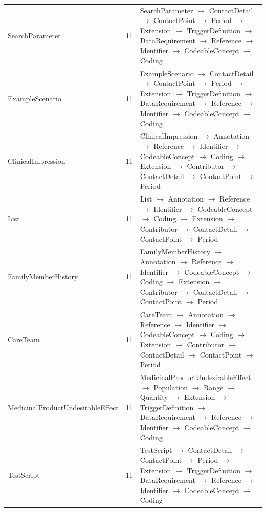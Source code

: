 \begin{longtable}{lrl}
SearchParameter & 11 & SearchParameter $\rightarrow$ ContactDetail $\rightarrow$ ContactPoint $\rightarrow$ Period $\rightarrow$ Extension $\rightarrow$ TriggerDefinition $\rightarrow$ DataRequirement $\rightarrow$ Reference $\rightarrow$ Identifier $\rightarrow$ CodeableConcept $\rightarrow$ Coding \\
ExampleScenario & 11 & ExampleScenario $\rightarrow$ ContactDetail $\rightarrow$ ContactPoint $\rightarrow$ Period $\rightarrow$ Extension $\rightarrow$ TriggerDefinition $\rightarrow$ DataRequirement $\rightarrow$ Reference $\rightarrow$ Identifier $\rightarrow$ CodeableConcept $\rightarrow$ Coding \\
ClinicalImpression & 11 & ClinicalImpression $\rightarrow$ Annotation $\rightarrow$ Reference $\rightarrow$ Identifier $\rightarrow$ CodeableConcept $\rightarrow$ Coding $\rightarrow$ Extension $\rightarrow$ Contributor $\rightarrow$ ContactDetail $\rightarrow$ ContactPoint $\rightarrow$ Period \\
List & 11 & List $\rightarrow$ Annotation $\rightarrow$ Reference $\rightarrow$ Identifier $\rightarrow$ CodeableConcept $\rightarrow$ Coding $\rightarrow$ Extension $\rightarrow$ Contributor $\rightarrow$ ContactDetail $\rightarrow$ ContactPoint $\rightarrow$ Period \\
FamilyMemberHistory & 11 & FamilyMemberHistory $\rightarrow$ Annotation $\rightarrow$ Reference $\rightarrow$ Identifier $\rightarrow$ CodeableConcept $\rightarrow$ Coding $\rightarrow$ Extension $\rightarrow$ Contributor $\rightarrow$ ContactDetail $\rightarrow$ ContactPoint $\rightarrow$ Period \\
CareTeam & 11 & CareTeam $\rightarrow$ Annotation $\rightarrow$ Reference $\rightarrow$ Identifier $\rightarrow$ CodeableConcept $\rightarrow$ Coding $\rightarrow$ Extension $\rightarrow$ Contributor $\rightarrow$ ContactDetail $\rightarrow$ ContactPoint $\rightarrow$ Period \\
MedicinalProductUndesirableEffect & 11 & MedicinalProductUndesirableEffect $\rightarrow$ Population $\rightarrow$ Range $\rightarrow$ Quantity $\rightarrow$ Extension $\rightarrow$ TriggerDefinition $\rightarrow$ DataRequirement $\rightarrow$ Reference $\rightarrow$ Identifier $\rightarrow$ CodeableConcept $\rightarrow$ Coding \\
TestScript & 11 & TestScript $\rightarrow$ ContactDetail $\rightarrow$ ContactPoint $\rightarrow$ Period $\rightarrow$ Extension $\rightarrow$ TriggerDefinition $\rightarrow$ DataRequirement $\rightarrow$ Reference $\rightarrow$ Identifier $\rightarrow$ CodeableConcept $\rightarrow$ Coding \\

\end{longtable}
